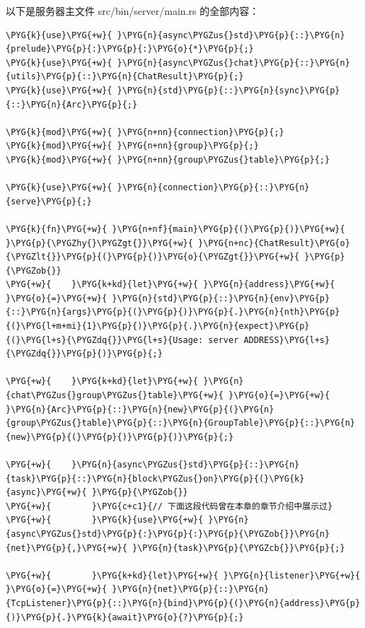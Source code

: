 以下是服务器主文件 src/bin/server/\allowbreak{}main.rs 的全部内容：

\begin{Verbatim}[commandchars=\\\{\},breaklines=true,breakanywhere=true,fontsize=\codefont,xleftmargin=17bp]
\PYG{k}{use}\PYG{+w}{ }\PYG{n}{async\PYGZus{}std}\PYG{p}{::}\PYG{n}{prelude}\PYG{p}{:}\PYG{p}{:}\PYG{o}{*}\PYG{p}{;}
\PYG{k}{use}\PYG{+w}{ }\PYG{n}{async\PYGZus{}chat}\PYG{p}{::}\PYG{n}{utils}\PYG{p}{::}\PYG{n}{ChatResult}\PYG{p}{;}
\PYG{k}{use}\PYG{+w}{ }\PYG{n}{std}\PYG{p}{::}\PYG{n}{sync}\PYG{p}{::}\PYG{n}{Arc}\PYG{p}{;}

\PYG{k}{mod}\PYG{+w}{ }\PYG{n+nn}{connection}\PYG{p}{;}
\PYG{k}{mod}\PYG{+w}{ }\PYG{n+nn}{group}\PYG{p}{;}
\PYG{k}{mod}\PYG{+w}{ }\PYG{n+nn}{group\PYGZus{}table}\PYG{p}{;}

\PYG{k}{use}\PYG{+w}{ }\PYG{n}{connection}\PYG{p}{::}\PYG{n}{serve}\PYG{p}{;}

\PYG{k}{fn}\PYG{+w}{ }\PYG{n+nf}{main}\PYG{p}{(}\PYG{p}{)}\PYG{+w}{ }\PYG{p}{\PYGZhy{}\PYGZgt{}}\PYG{+w}{ }\PYG{n+nc}{ChatResult}\PYG{o}{\PYGZlt{}}\PYG{p}{(}\PYG{p}{)}\PYG{o}{\PYGZgt{}}\PYG{+w}{ }\PYG{p}{\PYGZob{}}
\PYG{+w}{    }\PYG{k+kd}{let}\PYG{+w}{ }\PYG{n}{address}\PYG{+w}{ }\PYG{o}{=}\PYG{+w}{ }\PYG{n}{std}\PYG{p}{::}\PYG{n}{env}\PYG{p}{::}\PYG{n}{args}\PYG{p}{(}\PYG{p}{)}\PYG{p}{.}\PYG{n}{nth}\PYG{p}{(}\PYG{l+m+mi}{1}\PYG{p}{)}\PYG{p}{.}\PYG{n}{expect}\PYG{p}{(}\PYG{l+s}{\PYGZdq{}}\PYG{l+s}{Usage: server ADDRESS}\PYG{l+s}{\PYGZdq{}}\PYG{p}{)}\PYG{p}{;}

\PYG{+w}{    }\PYG{k+kd}{let}\PYG{+w}{ }\PYG{n}{chat\PYGZus{}group\PYGZus{}table}\PYG{+w}{ }\PYG{o}{=}\PYG{+w}{ }\PYG{n}{Arc}\PYG{p}{::}\PYG{n}{new}\PYG{p}{(}\PYG{n}{group\PYGZus{}table}\PYG{p}{::}\PYG{n}{GroupTable}\PYG{p}{::}\PYG{n}{new}\PYG{p}{(}\PYG{p}{)}\PYG{p}{)}\PYG{p}{;}

\PYG{+w}{    }\PYG{n}{async\PYGZus{}std}\PYG{p}{::}\PYG{n}{task}\PYG{p}{::}\PYG{n}{block\PYGZus{}on}\PYG{p}{(}\PYG{k}{async}\PYG{+w}{ }\PYG{p}{\PYGZob{}}
\PYG{+w}{        }\PYG{c+c1}{// 下面这段代码曾在本章的章节介绍中展示过}
\PYG{+w}{        }\PYG{k}{use}\PYG{+w}{ }\PYG{n}{async\PYGZus{}std}\PYG{p}{:}\PYG{p}{:}\PYG{p}{\PYGZob{}}\PYG{n}{net}\PYG{p}{,}\PYG{+w}{ }\PYG{n}{task}\PYG{p}{\PYGZcb{}}\PYG{p}{;}

\PYG{+w}{        }\PYG{k+kd}{let}\PYG{+w}{ }\PYG{n}{listener}\PYG{+w}{ }\PYG{o}{=}\PYG{+w}{ }\PYG{n}{net}\PYG{p}{::}\PYG{n}{TcpListener}\PYG{p}{::}\PYG{n}{bind}\PYG{p}{(}\PYG{n}{address}\PYG{p}{)}\PYG{p}{.}\PYG{k}{await}\PYG{o}{?}\PYG{p}{;}


\end{Verbatim}
